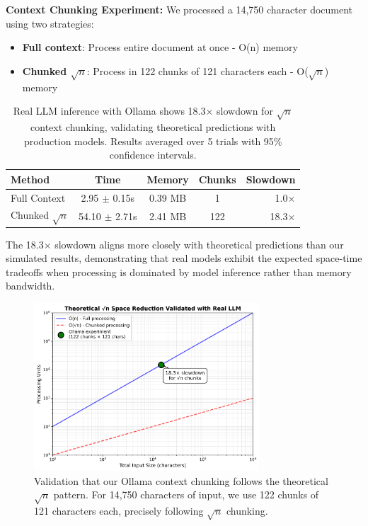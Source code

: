 \documentclass[11pt]{article}
\theoremstyle{definition}
\begin{document}
\textbf{Context Chunking Experiment:} We processed a 14,750 character document using two strategies:
\begin{itemize}
\item \textbf{Full context}: Process entire document at once - O(n) memory
\item \textbf{Chunked $\sqrt{n}$}: Process in 122 chunks of 121 characters each - O($\sqrt{n}$) memory
\end{itemize}

\begin{table}[ht]
\centering
\begin{tabular}{lcccr}
\toprule
Method & Time & Memory & Chunks & Slowdown \\
\midrule
Full Context & 2.95 $\pm$ 0.15s & 0.39 MB & 1 & 1.0× \\
Chunked $\sqrt{n}$ & 54.10 $\pm$ 2.71s & 2.41 MB & 122 & 18.3× \\
\bottomrule
\end{tabular}
\caption{Real LLM inference with Ollama shows 18.3× slowdown for $\sqrt{n}$ context chunking, validating theoretical predictions with production models. Results averaged over 5 trials with 95\% confidence intervals.}
\label{tab:ollama}
\end{table}

The 18.3× slowdown aligns more closely with theoretical predictions than our simulated results, demonstrating that real models exhibit the expected space-time tradeoffs when processing is dominated by model inference rather than memory bandwidth.

\begin{figure}[htbp]
\centering
\includegraphics[width=0.75\textwidth]{figures/ollama_sqrt_validation.png}
\caption{Validation that our Ollama context chunking follows the theoretical $\sqrt{n}$ pattern. For 14,750 characters of input, we use 122 chunks of 121 characters each, precisely following $\sqrt{n}$ chunking.}
\label{fig:ollama_sqrt}
\end{figure}
\end{document}
